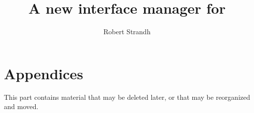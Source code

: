 \documentclass{report}
\title{\clim{}\\ A new interface manager for\\ \cl{}}
\author{Robert Strandh}
\def\inputtex#1{}
\begin{document}
\maketitle

\tableofcontents

\inputtex{chap-preliminaries.tex}
\inputtex{chap-introduction.tex}
\inputtex{chap-zones.tex}
\inputtex{chap-input-events.tex}
\inputtex{chap-command-loop.tex}
\inputtex{chap-zone-protocols.tex}
\inputtex{chap-comparing-children.tex}

\part{Appendices}

This part contains material that may be deleted later, or that may be
reorganized and moved.  

\appendix
\inputtex{chap-changes-from-clim-ii.tex}
\inputtex{chap-optimal-redrawing.tex}
\inputtex{chap-output-recording.tex}
\end{document}
